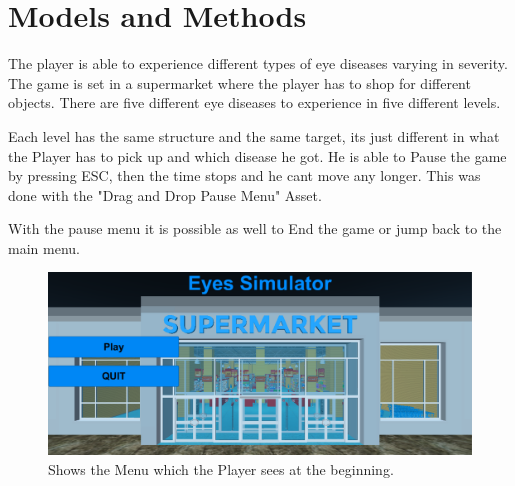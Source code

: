 \documentclass{sig-alternate-05-2015}
\begin{document}
\section{Models and Methods}


The player is able to experience different types of eye diseases varying in severity. The game is set in a supermarket where the player has to shop for different objects. There are five different eye diseases to experience in five different levels.

Each level has the same structure and the same target, its just different in what the Player has to pick up and which disease he got. He is able to Pause the game by pressing ESC, then the time stops and he cant move any longer. This was done with the "Drag and Drop Pause Menu" Asset. 

With the pause menu it is possible as well to End the game or jump back to the main menu.

\begin{figure}
    \centering
    \includegraphics[width=\columnwidth]{Menu.png}
    \caption{Shows the Menu which the Player sees at the beginning.}
    \label{fig:menu}
\end{figure}
\end{document}
